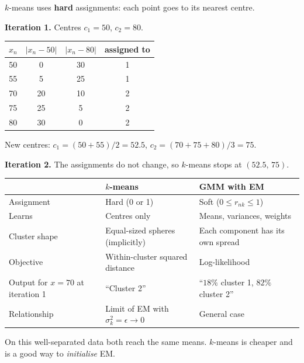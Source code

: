 \documentclass[11pt,a4paper]{article}
\begin{document}
\begin{example}
$k$-means uses \textbf{hard} assignments: each point goes to its nearest centre.

\textbf{Iteration 1.} Centres $c_1=50$, $c_2=80$.
\begin{center}
\begin{tabular}{@{}cccc@{}}
\toprule
$x_n$ & $|x_n-50|$ & $|x_n-80|$ & assigned to\\
\midrule
50 & 0 & 30 & 1\\
55 & 5 & 25 & 1\\
70 & 20 & 10 & 2\\
75 & 25 & 5 & 2\\
80 & 30 & 0 & 2\\
\bottomrule
\end{tabular}
\end{center}
New centres: $c_1=(50+55)/2=52.5$, $c_2=(70+75+80)/3=75$.

\textbf{Iteration 2.} The assignments do not change, so $k$-means stops at $(52.5,\,75)$.
\end{example}

\begin{center}
\begin{tabular}{@{}p{3.6cm}p{5.2cm}p{5.6cm}@{}}
\toprule
& $k$-means & GMM with EM\\
\midrule
Assignment & Hard (0 or 1) & Soft ($0\le r_{nk}\le1$)\\
Learns & Centres only & Means, variances, weights\\
Cluster shape & Equal-sized spheres (implicitly) & Each component has its own spread\\
Objective & Within-cluster squared distance & Log-likelihood\\
Output for $x=70$ at iteration 1 & ``Cluster 2'' & ``$18\%$ cluster 1, $82\%$ cluster 2''\\
Relationship & Limit of EM with $\sigma_k^2=\epsilon\to0$ & General case\\
\bottomrule
\end{tabular}
\end{center}
On this well-separated data both reach the same means. $k$-means is cheaper and is a good way to \emph{initialise} EM.
\end{document}
